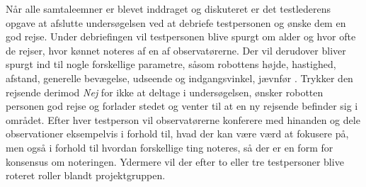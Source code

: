 Når alle samtaleemner er blevet inddraget og diskuteret er det testlederens opgave at afslutte undersøgelsen ved at debriefe testpersonen og ønske dem en god rejse. Under debriefingen vil testpersonen blive spurgt om alder og hvor ofte de rejser, hvor kønnet noteres af en af observatørerne. Der vil derudover bliver spurgt ind til nogle forskellige parametre, såsom robottens højde, hastighed, afstand, generelle bevægelse, udseende og indgangsvinkel, jævnfør .\blankline      
%
Trykker den rejsende derimod \textit{Nej} for ikke at deltage i undersøgelsen, ønsker robotten personen god rejse og forlader stedet og venter til at en ny rejsende befinder sig i området.\blankline
%
Efter hver testperson vil observatørerne konferere med hinanden og dele observationer eksempelvis i forhold til, hvad der kan være værd at fokusere på, men også i forhold til hvordan forskellige ting noteres, så der er en form for konsensus om noteringen. Ydermere vil der efter to eller tre testpersoner blive roteret roller blandt projektgruppen.  


